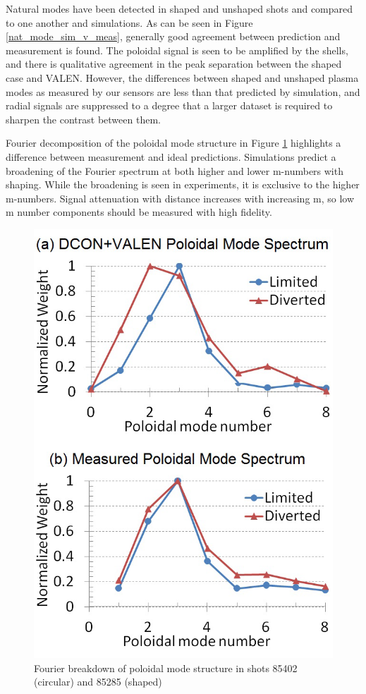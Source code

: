 \documentclass[aps,preprint,showpacs,superscriptaddress,groupedaddress]{revtex4}  %
\begin{document}
	Natural modes have been detected in shaped and unshaped shots and compared to one another and simulations.  As can be seen in Figure \ref{nat_mode_sim_v_meas}, generally good agreement between prediction and measurement is found.  The poloidal signal is seen to be amplified by the shells, and there is qualitative agreement in the peak separation between the shaped case and VALEN.  %
However, the differences between shaped and unshaped plasma modes as measured by our sensors are less than that predicted by simulation, and radial signals are suppressed to a degree that a larger dataset is required to sharpen the contrast between them.\par
	Fourier decomposition of the poloidal mode structure in Figure \ref{mike_mode_structure} highlights a difference between measurement and ideal predictions.  Simulations predict a broadening of the Fourier spectrum at both higher and lower m-numbers with shaping.  While the broadening is seen in experiments, it is exclusive to the higher m-numbers.  Signal attenuation with distance increases with increasing m, so low m number components should be measured with high fidelity.\par
	\begin{figure}[htb]
	\centering
\includegraphics[scale=.5]{../Plots/fig2_mode_spectrum_REV2.png}\caption{Fourier breakdown of poloidal mode structure in shots 85402 (circular) and 85285 (shaped)}
	\label{mike_mode_structure}
	\end{figure}
\end{document}
